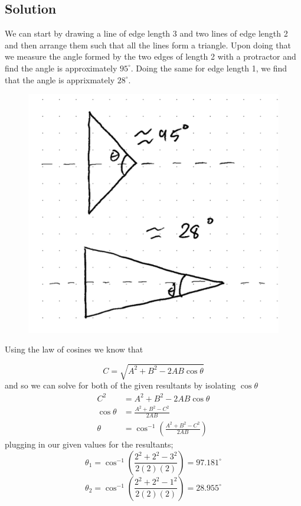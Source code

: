 \documentclass{article}
\begin{document}
\subsection*{Solution}
We can start by drawing a line of edge length 3 and two lines of edge length 2 and then arrange them such that all the lines form a triangle. Upon doing that we measure the angle formed by the two edges of length 2 with a protractor and find the angle is approximately $95^\circ$. Doing the same for edge length 1, we find that the angle is apprixmately $28^\circ$.
\begin{figure}[ht]
    \centering
    \includegraphics[scale=0.20]{drawing.png}
\end{figure}

Using the law of cosines we know that

\[
	C = \sqrt{A^2 + B^2 - 2AB \cos\theta}
\]
and so we can solve for both of the given resultants by isolating $\cos\theta$
\begin{align*}
	C^2 &=  A^2 + B^2 - 2AB \cos\theta \\
	\cos\theta &= \frac{A^2 + B^2 - C^2}{2AB} \\
	\theta &= \cos^{-1}\left( \frac{A^2 + B^2 - C^2}{2AB} \right)
\end{align*}
plugging in our given values for the resultants;
\[
	\theta_1 = \cos^{-1}\left( \frac{2^2 + 2^2 - 3^2}{2 (2) (2)} \right) = 97.181^\circ
\]
\[
	\theta_2 = \cos^{-1}\left( \frac{2^2 + 2^2 - 1^2}{2 (2) (2)} \right) = 28.955^\circ
\]
\end{document}
